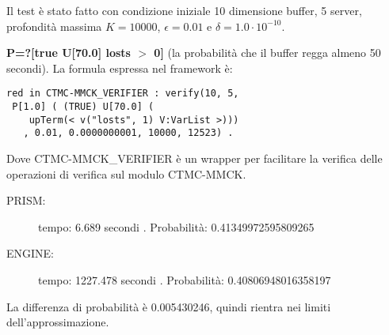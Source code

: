 Il test è stato fatto con condizione iniziale 10 dimensione buffer, 5 server,
profondità massima $K = 10000$, $\epsilon = 0.01$ e $\delta = 1.0\cdot10^{-10}$.

\textbf{P=?[true U[70.0] losts $>$ 0]} (la probabilità che il buffer regga
almeno 50 secondi). La formula espressa nel framework è:
\begin{Verbatim}
red in CTMC-MMCK_VERIFIER : verify(10, 5,
 P[1.0] ( (TRUE) U[70.0] ( 
    upTerm(< v("losts", 1) V:VarList >)))
   , 0.01, 0.0000000001, 10000, 12523) .
\end{Verbatim}
Dove CTMC-MMCK\_VERIFIER è un wrapper per facilitare la verifica delle
operazioni di verifica sul modulo CTMC-MMCK.

\begin{description}
	\item[PRISM:] tempo: 6.689 secondi . Probabilità: 0.41349972595809265
	\item[ENGINE:] tempo: 1227.478 secondi . Probabilità: 0.40806948016358197
\end{description}

La differenza di probabilità è  0.005430246, quindi rientra nei limiti
dell'approssimazione.
